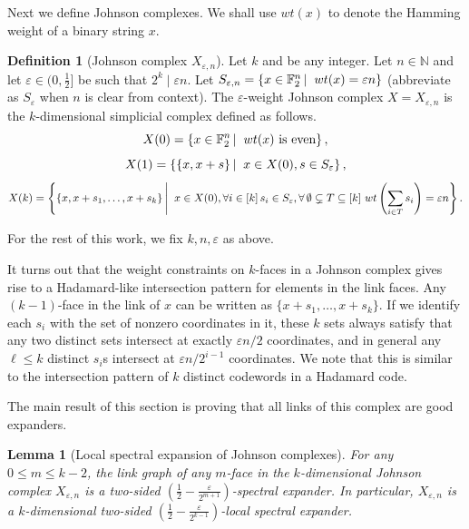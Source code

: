 \documentclass[10pt,a4paper]{article}
\newtheorem{lemma}[theorem]{Lemma}
\theoremstyle{definition}
\newtheorem{definition}[theorem]{Definition}
\theoremstyle{remark}
\newcommand\sett[2]{\left\{ #1 \left| \; \vphantom{#1 #2} \right. #2  \right\}}
\newcommand{\set}[1]{\{#1\}}
\renewcommand{\le}{\leqslant}
\numberwithin{equation}{section}
\def\diml{d}
\begin{document}
Next we define Johnson complexes. We shall use $wt(x)$ to denote the Hamming weight of a binary string $x$.
\begin{definition}[Johnson complex $X_{\varepsilon,n}$]\label{def:Johnson-complex}
Let \(k\) and  be any integer. Let \(n\in\mathbb{N}\) and let \(\varepsilon \in (0,\frac{1}{2}]\) be such that \(2^k \; | \; \varepsilon n\). Let \(S_{\varepsilon,n}  = \sett{x \in \mathbb{F}_2^n}{wt(x) = \varepsilon n}\) (abbreviate as \(S_{\varepsilon}\) when \(n\) is clear from context). The \(\varepsilon\)-weight Johnson complex \(X = X_{\varepsilon,n}\) is the \(k\)-dimensional simplicial complex defined as follows.
\[X(0) = \sett{x \in \mathbb{F}_2^n}{ wt(x) \text{ is even}},\]
\[X(1) = \sett{\set{x,x+s}}{x \in X(0), s \in S_{\varepsilon}},\]
\[X(k) = \sett{\set{x,x+ s_1,\dots,x+ s_k}}{x \in X(0),\forall i\in[k]\,s_i\in S_{\varepsilon}, \forall\,\emptyset\subsetneq T \subseteq [k]~wt\left(\sum_{i \in T}s_i\right) = \varepsilon n}.\]
\end{definition}
For the rest of this work, we fix \(k,n,\varepsilon\) as above.

It turns out that the weight constraints on $k$-faces in a Johnson complex gives rise to a Hadamard-like intersection pattern for elements in the link faces. Any $(k-1)$-face in the link of $x$ can be written as $\set{x+s_1,\dots,x+s_k}$. If we identify each $s_i$ with the set of nonzero coordinates in it, these $k$ sets always satisfy that any two distinct sets intersect at exactly $\varepsilon n/2$ coordinates, and in general any $\ell \le k$ distinct $s_i$s intersect at $\varepsilon n/2^{i-1}$ coordinates. We note that this is similar to the intersection pattern of $k$ distinct codewords in a Hadamard code. 




The main result of this section is proving that all links of this complex are good expanders.
\begin{lemma}[Local spectral expansion of Johnson complexes]\label{lem:Johnson-complex-spectral-expansion}
    For any $0\le m \le k-2$, the link graph of any $m$-face in the $k$-dimensional Johnson complex $X_{\varepsilon,n}$ is a two-sided $ \left(\frac{1}{2}-\frac{\varepsilon}{2^{m+1}}\right)$-spectral expander. In particular,  $X_{\varepsilon,n}$ is a $k$-dimensional two-sided $\left(\frac{1}{2}-\frac{\varepsilon}{2^{k-1}}\right)$-local spectral expander. 
\end{lemma}
\end{document}
